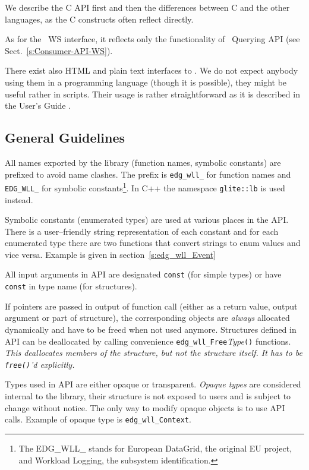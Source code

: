 We describe the C API first and then the differences between C and the
other languages, as the C constructs often reflect directly.

As for the \LB\ WS interface, it reflects only the functionality of 
\LB\ Querying API (see Sect.~\ref{s:Consumer-API-WS}). 

There exist also HTML and plain text interfaces to \LB. We do not expect anybody using them 
in a programming language (though it is possible), they might be useful rather in
scripts. Their usage is rather straightforward as it is described in the User's Guide \cite{lbug}.


\subsection{General Guidelines}

%
All names exported by the \LB library (function names, symbolic
constants) are prefixed to avoid name clashes. The prefix is
\verb'edg_wll_' for function names and \verb'EDG_WLL_' for
symbolic constants\footnote{The EDG\_WLL\_ stands for European
DataGrid, the original EU project, and Workload Logging, the subsystem
identification.}. In C++ the namespace \verb'glite::lb' is used
instead.

%
Symbolic constants (\ie enumerated types) are used at various places in the \LB
API. There is a user--friendly string representation of each
constant and for each enumerated type there are two functions that
convert strings to enum values and vice versa. Example is given in
section~\ref{s:edg_wll_Event}

%
All input arguments in \LB API are designated \verb'const' (for simple
types) or have \verb'const' in type name (for structures).

If pointers are passed in output of function call (either as a return
value, output argument or part of structure), the corresponding
objects are \emph{always} allocated dynamically and have to be freed
when not used anymore. Structures defined in \LB API can be
deallocated by calling convenience
\verb'edg_wll_Free'\textit{Type}\verb'()' functions. {\it This
deallocates members of the structure, but not the structure itself. It
has to be \verb'free()''d explicitly.}

%
Types used in \LB API are either opaque or transparent. \textit{Opaque
types} are considered internal to the library, their structure is not
exposed to users and is subject to change without notice. The only way
to modify opaque objects is to use API calls. Example of opaque type
is \verb'edg_wll_Context'.

